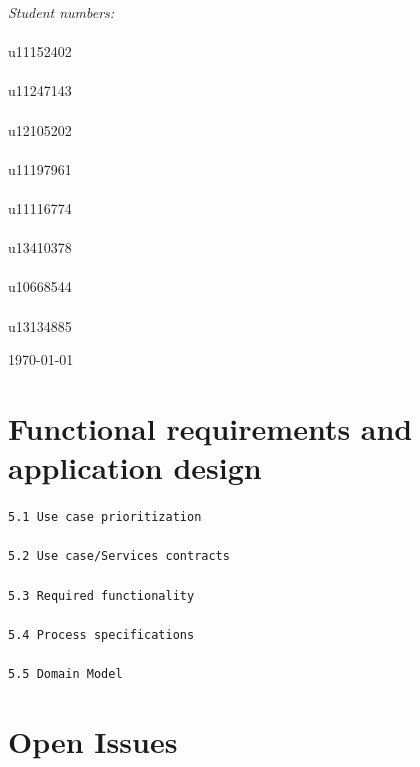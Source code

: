 \documentclass[a4paper,12pt]{report}
\begin{document}
\begin{titlepage}
\begin{center}
\begin{minipage}{0.4\textwidth}
\begin{flushright}
\emph{Student numbers:} \\
\emph{}\\
u11152402
\emph{}\\
\emph{}\\
u11247143
\emph{}\\
\emph{}\\
u12105202
\emph{}\\
\emph{}\\
u11197961
\emph{}\\
\emph{}\\
u11116774
\emph{}\\
\emph{}\\
u13410378
\emph{}\\
\emph{}\\
u10668544
\emph{}\\
\emph{}\\
u13134885


\end{flushright}
\end{minipage}
\vfill


{\large \today}
\end{center}
\end{titlepage}
\setcounter{chapter}{1}
\renewcommand{\thesection}{\arabic{section}}



\section{Functional requirements and application design}

\texttt{5.1 Use case prioritization}
\emph{}\\
\emph{}\\
\texttt{5.2 Use case/Services contracts}
\emph{}\\
\emph{}\\
\texttt{5.3 Required functionality}
\emph{}\\
\emph{}\\
\texttt{5.4 Process specifications}
\emph{}\\
\emph{}\\
\texttt{5.5 Domain Model}

\newpage
\section{Open Issues}
\end{document}
